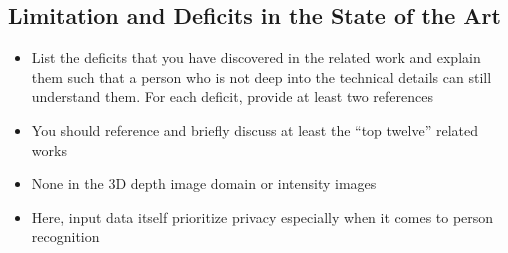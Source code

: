 \documentclass[thesis]{mas_proposal}
\begin{document}
\subsection{Limitation and Deficits in the State of the Art}
\begin{itemize}


      \item List the deficits that you have discovered in the related work and explain them such that a person who is not deep into the technical details can still understand them.
            For each deficit, provide at least two references
      \item You should reference and briefly discuss at least the ``top twelve'' related works
      \item None in the 3D depth image domain or intensity images
      \item Here, input data itself prioritize privacy especially when it comes to person recognition
\end{itemize}
\end{document}

